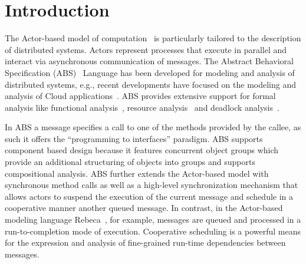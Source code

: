 \section{Introduction}

The Actor-based model of computation~\cite{Agha} is particularly tailored to the description of distributed systems. Actors represent processes that execute in parallel and interact via asynchronous communication of messages. The Abstract Behavioral Specification (ABS)~\cite{abs} Language has been developed for modeling and analysis of distributed systems, e.g., recent developments
have focused on the modeling and analysis of Cloud applications~\cite{Albert}.
ABS provides extensive support for formal analysis like functional analysis~\cite{KeY}, resource analysis~\cite{saco} and deadlock analysis~\cite{dead}.

In ABS a message specifies a call to one of the methods provided by the callee,
as such it offers the ``programming to interfaces'' paradigm.
ABS supports component based design because it features concurrent object groups which provide an additional structuring of objects into groups and supports compositional analysis. ABS further extends the Actor-based model with synchronous method calls as well as a high-level synchronization mechanism that allows actors to suspend the execution of the current message and schedule in a cooperative manner another
queued message. In contrast, in the Actor-based modeling language Rebeca~\cite{Sirjani}, for example,
messages are queued and processed in a run-to-completion mode of execution.
Cooperative scheduling is a powerful means for the expression and analysis
of fine-grained run-time dependencies between messages.




